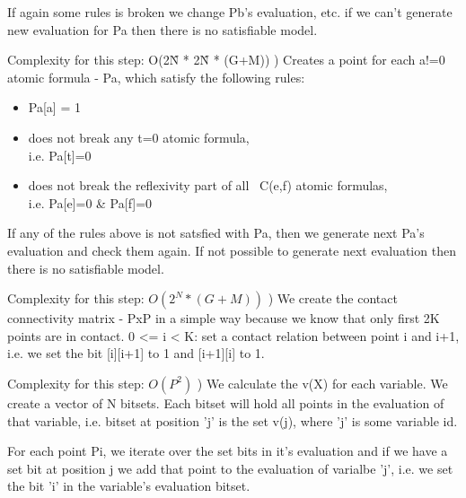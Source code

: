 \documentclass{article}
\begin{document}
				If again some rules is broken we change Pb's evaluation, etc. 
				if we can't generate new evaluation for Pa then there is no satisfiable model.
				\newline

				Complexity for this step: O(2\^N * 2\^N * (G+M))
				\newline
				) Creates a point for each a!=0 atomic formula - Pa, which satisfy the following rules:
				\begin{itemize}
					\item Pa[a] = 1
					\item does not break any t=0 atomic formula, \\
						i.e. Pa[t]=0
					\item does not break the reflexivity part of all ~C(e,f) atomic formulas, \\
						i.e. Pa[e]=0 \& Pa[f]=0
				\end{itemize}

				If any of the rules above is not satsfied with Pa, 
				then we generate next Pa's evaluation and check them again. 
				If not possible to generate next evaluation then there is no satisfiable model.
				\newline

				Complexity for this step: $O(2^N * (G+M))$
				\newline
				) We create the contact connectivity matrix - 
				PxP in a simple way because we know that only first 2K points are in contact.
				0 <= i < K: set a contact relation between point i and i+1, 
				i.e. we set the bit [i][i+1] to 1 and [i+1][i] to 1.
				\newline

				Complexity for this step: $O(P^2)$
				\newline
				) We calculate the v(X) for each variable.
				We create a vector of N bitsets. 
				Each bitset will hold all points in the evaluation of that variable, 
				i.e. bitset at position 'j' is the set v(j), where 'j' is some variable id.
				\newline

				For each point Pi, we iterate over the set bits in it's evaluation and 
				if we have a set bit at position j we add that point to the evaluation 
				of varialbe 'j', i.e. we set the bit 'i' in the variable's evaluation bitset.
				\newline
\end{document}
